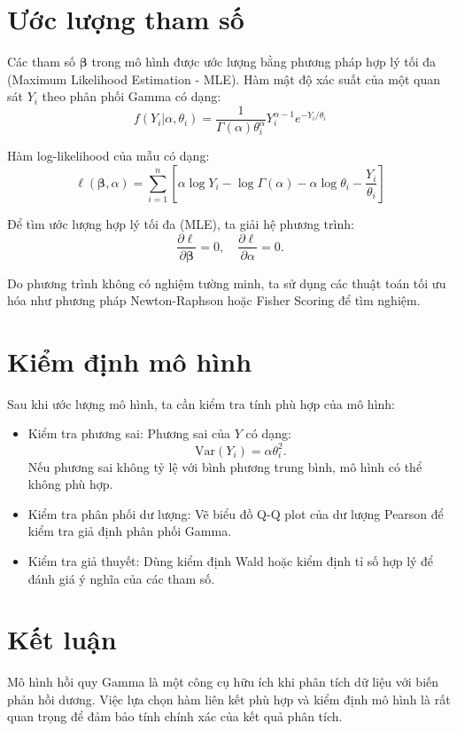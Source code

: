 \section{Ước lượng tham số}
Các tham số $\boldsymbol{\beta}$ trong mô hình được ước lượng bằng phương pháp hợp lý tối đa (Maximum Likelihood Estimation - MLE). Hàm mật độ xác suất của một quan sát $Y_i$ theo phân phối Gamma có dạng:
\begin{equation}
    f(Y_i | \alpha, \theta_i) = \frac{1}{\Gamma(\alpha) \theta_i^{\alpha}} Y_i^{\alpha - 1} e^{-Y_i / \theta_i}
\end{equation}

Hàm log-likelihood của mẫu có dạng:
\begin{equation}
    \ell(\boldsymbol{\beta}, \alpha) = \sum_{i=1}^{n} \left[ \alpha \log Y_i - \log \Gamma(\alpha) - \alpha \log \theta_i - \frac{Y_i}{\theta_i} \right]
\end{equation}

Để tìm ước lượng hợp lý tối đa (MLE), ta giải hệ phương trình:
\begin{equation}
    \frac{\partial \ell}{\partial \boldsymbol{\beta}} = 0, \quad \frac{\partial \ell}{\partial \alpha} = 0.
\end{equation}

Do phương trình không có nghiệm tường minh, ta sử dụng các thuật toán tối ưu hóa như phương pháp Newton-Raphson hoặc Fisher Scoring để tìm nghiệm.

\section{Kiểm định mô hình}
Sau khi ước lượng mô hình, ta cần kiểm tra tính phù hợp của mô hình:
\begin{itemize}
    \item Kiểm tra phương sai: Phương sai của $Y$ có dạng:
    \begin{equation}
        \text{Var}(Y_i) = \alpha \theta_i^2.
    \end{equation}
    Nếu phương sai không tỷ lệ với bình phương trung bình, mô hình có thể không phù hợp.
    \item Kiểm tra phân phối dư lượng: Vẽ biểu đồ Q-Q plot của dư lượng Pearson để kiểm tra giả định phân phối Gamma.
    \item Kiểm tra giả thuyết: Dùng kiểm định Wald hoặc kiểm định tỉ số hợp lý để đánh giá ý nghĩa của các tham số.
\end{itemize}

\section{Kết luận}
Mô hình hồi quy Gamma là một công cụ hữu ích khi phân tích dữ liệu với biến phản hồi dương. Việc lựa chọn hàm liên kết phù hợp và kiểm định mô hình là rất quan trọng để đảm bảo tính chính xác của kết quả phân tích.